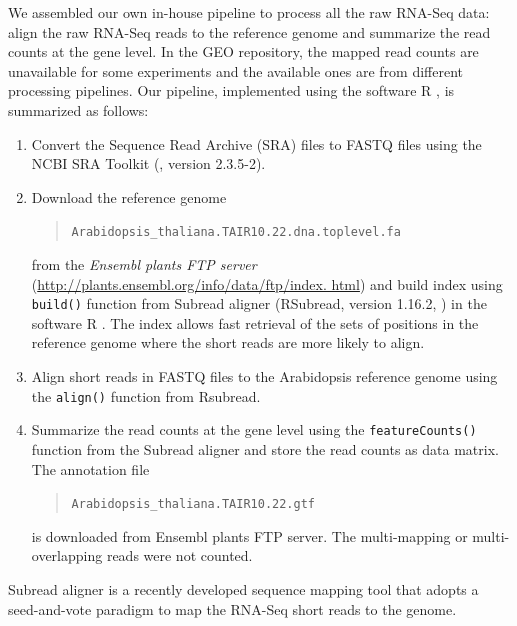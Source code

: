 \documentclass[letterpaper,12pt]{article}
\begin{document}
 
We assembled our own in-house pipeline to process all the raw RNA-Seq data:
align the raw RNA-Seq reads to the reference genome and summarize the read counts at the 
gene level. In the GEO repository, the
mapped read counts are unavailable for some experiments and the available ones
are from different processing pipelines.  
Our pipeline, implemented using the software R \citep{Rpackage}, is summarized as follows: 
\begin{enumerate}
    \item Convert the Sequence Read Archive (SRA) files to FASTQ files using the NCBI SRA Toolkit (\cite{leinonen2010sequence}, version 2.3.5-2).
    \item Download the reference genome 
         \begin{quote}
    	\verb|Arabidopsis_thaliana.TAIR10.22.dna.toplevel.fa |
    \end{quote} 
    from the \textit{ Ensembl plants FTP server} (\url{http://plants.ensembl.org/info/data/ftp/index. html}) and build index using \verb|build()| function from 
    Subread aligner (RSubread, version 1.16.2, \citealt{liao2013subread}) in the software R
    \citep{ Rpackage}. The index allows fast retrieval of the sets of positions in the reference genome where the short reads are more likely to align. 
    \item Align short reads in FASTQ files to the Arabidopsis reference genome using the \verb|align()| function from Rsubread. 
 \item
     Summarize the read counts at the gene level using the \verb|featureCounts()| function from the
     Subread aligner
     and store the read counts as data matrix.  
     The annotation file 
     \begin{quote}
     \verb"Arabidopsis_thaliana.TAIR10.22.gtf" 
 \end{quote}
     is downloaded from Ensembl plants FTP server. The multi-mapping or
     multi-overlapping reads were not counted.  

\end{enumerate}
Subread aligner is a recently developed sequence mapping tool that adopts a
seed-and-vote paradigm to map the RNA-Seq short reads to the genome. 
\end{document}
